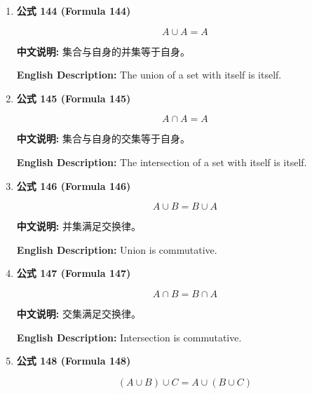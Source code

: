 \documentclass[12pt,a4paper]{article}
\begin{document}
\begin{enumerate}[leftmargin=*]
\item \textbf{公式 144 (Formula 144)}

\begin{equation}
A \cup A = A
\end{equation}

\textbf{中文说明:} 集合与自身的并集等于自身。

\textbf{English Description:} The union of a set with itself is itself.

\vspace{0.5cm}

\item \textbf{公式 145 (Formula 145)}

\begin{equation}
A \cap A = A
\end{equation}

\textbf{中文说明:} 集合与自身的交集等于自身。

\textbf{English Description:} The intersection of a set with itself is itself.

\vspace{0.5cm}

\item \textbf{公式 146 (Formula 146)}

\begin{equation}
A \cup B = B \cup A
\end{equation}

\textbf{中文说明:} 并集满足交换律。

\textbf{English Description:} Union is commutative.

\vspace{0.5cm}

\item \textbf{公式 147 (Formula 147)}

\begin{equation}
A \cap B = B \cap A
\end{equation}

\textbf{中文说明:} 交集满足交换律。

\textbf{English Description:} Intersection is commutative.

\vspace{0.5cm}

\item \textbf{公式 148 (Formula 148)}

\begin{equation}
(A \cup B) \cup C = A \cup (B \cup C)
\end{equation}


\end{enumerate}
\end{document}
